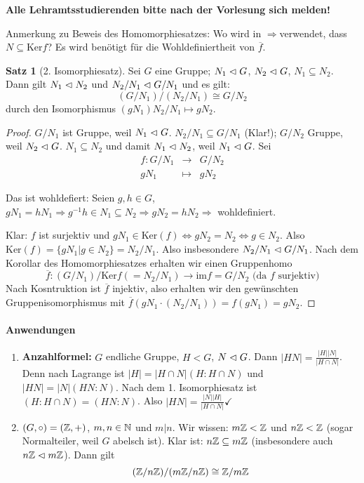 \documentclass[12pt,a4paper]{article}
\newcounter{thmcounter}[subsection]
\theoremstyle{definition}
\theoremstyle{remark}
\theoremstyle{definition}
\newtheorem{satz}[thmcounter]{Satz}
\theoremstyle{definition}
\theoremstyle{plain}
\theoremstyle{plain}
\begin{document}
\textbf{\Huge{Alle Lehramtsstudierenden bitte nach der Vorlesung sich melden!}}
\bigskip

Anmerkung zu Beweis des Homomorphiesatzes: Wo wird in \glqq$\Rightarrow$\grqq verwendet, dass $N\subseteq \mbox{Ker}f$? Es wird benötigt für die Wohldefiniertheit von $\overline{f}$.


\begin{satz}[2. Isomorphiesatz]
	Sei $G$ eine Gruppe; $N_1\vartriangleleft G$, $N_2\vartriangleleft G$, $N_1\subseteq N_2$. Dann gilt $N_1\vartriangleleft N_2$ und $N_2/N_1\vartriangleleft G/N_1$ und es gilt:
	$$(G/N_1)/(N_2/N_1) \cong G/N_2$$ durch den Isomorphismus $(gN_1)N_2/N_1\mapsto gN_2$.
\end{satz}	

\begin{proof}
	$G/N_1$ ist Gruppe, weil $N_1\vartriangleleft G$. $N_2/N_1\subseteq G/N_1$ (Klar!); $G/N_2$ Gruppe, weil $N_2\vartriangleleft G$. $N_1\subseteq N_2$ und damit $N_1\vartriangleleft N_2$, weil $N_1\vartriangleleft G$. Sei
	\begin{eqnarray*}
		f\colon G/N_1 & \to &G/N_2\\
		gN_1 & \mapsto & gN_2
	\end{eqnarray*}
	
	Das ist wohldefiert: Seien $g, h\in G$, $gN_1 = hN_1\Rightarrow g^{-1}h\in N_1\subseteq N_2\Rightarrow gN_2 = hN_2\Rightarrow$ wohldefiniert.
	
	Klar: $f$ ist surjektiv und $gN_1\in \mbox{Ker}(f)\Leftrightarrow gN_2 = N_2\Leftrightarrow g\in N_2$. Also $\mbox{Ker}(f) = \{gN_1|g\in N_2\} = N_2/N_1$. Also insbesondere $N_2/N_1\vartriangleleft G/N_1$.
	Nach dem Korollar des Homomorphiesatzes erhalten wir einen Gruppenhomo
	$$ \overline{f}\colon (G/N_1)/\mbox{Ker}f(=N_2/N_1)\to \mbox{im}f = G/N_2 \mbox{ (da $f$ surjektiv)}$$
	Nach Kosntruktion ist $\overline{f}$ injektiv, also erhalten wir den gewünschten Gruppenisomorphismus mit $\overline{f}(gN_1\cdot (N_2/N_1)) = f(gN_1) = gN_2$.
\end{proof}

\paragraph{Anwendungen}
\begin{enumerate}
	\item \textbf{Anzahlformel:} $G$ endliche Gruppe, $H<G$, $N\vartriangleleft G$. Dann $|HN| =\frac{ |H||N|}{|H\cap N|}$. Denn nach Lagrange ist $|H| = |H\cap N|(H:H\cap N)$ und $|HN| = |N|(HN:N)$. Nach dem 1. Isomorphiesatz ist $(H:H\cap N)=(HN:N)$. Also $|HN| = \frac{|N||H|}{|H\cap N|}$\hfill $\checkmark$
	\item $(G,\circ) = (\mathbb Z, +)$, $m,n\in\mathbb N$ und $m|n$. Wir wissen: $m\mathbb Z<\mathbb Z$ und $n\mathbb Z<\mathbb Z$ (sogar Normalteiler, weil $G$ abelsch ist). Klar ist: $n\mathbb Z\subseteq m\mathbb Z$ (insbesondere auch $n\mathbb Z\vartriangleleft m\mathbb Z$). Dann gilt 
	$$(\mathbb Z/n\mathbb Z)/(m\mathbb Z/n\mathbb Z) \cong \mathbb Z/m\mathbb Z$$
\end{enumerate}
\end{document}
